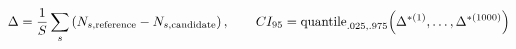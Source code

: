 \documentclass[12pt]{article}
\begin{document}
\fontsize{23}{29}\selectfont\[
\Delta=\frac1S\sum_s\left(N_{s,\rm reference}-N_{s,\rm candidate}\right),\qquad CI_{95}=\operatorname{quantile}_{.025,.975}\!\left(\Delta^{*(1)},\ldots,\Delta^{*(1000)}\right)
\]
\end{document}
